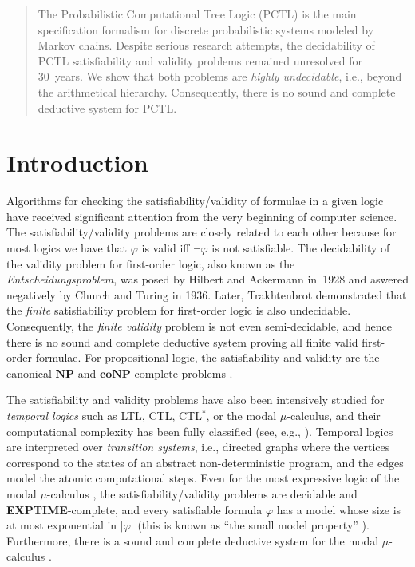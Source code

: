 \documentclass[a4paper,UKenglish,cleveref, autoref, thm-restate]{lipics-v2021}
\author{Miroslav Chodil}{Faculty of Informatics, Masaryk University, Brno, Czechia}{miroslav@chodil.com}{0000-0002-8406-0443}{}\author{Anton\'{\i}n Ku\v{c}era}{Faculty of Informatics, Masaryk University, Brno, Czechia}{tony@fi.muni.cz}{0000-0002-6602-8028}{}
\newcommand{\EXPTIME}{\textbf{EXPTIME}}
\newcommand{\NP}{\textbf{NP}}
\newcommand{\coNP}{\mathbf{coNP}}
\begin{document}
\maketitle



\begin{abstract}
    The Probabilistic Computational Tree Logic (PCTL) is the main specification formalism for discrete probabilistic systems modeled by Markov chains. 
    Despite serious research attempts, the decidability of PCTL satisfiability and validity problems remained unresolved for 30~years. We show that both problems are \emph{highly undecidable}, i.e., beyond the arithmetical hierarchy. Consequently, there is no sound and complete deductive system for PCTL. 
\end{abstract}

\section{Introduction}
\label{sec-intro}

Algorithms for checking the satisfiability/validity of formulae in a given logic have received significant attention from the very beginning of computer science. The satisfiability/validity problems are closely related to each other because for most logics we have that $\varphi$ is valid iff $\neg\varphi$ is not satisfiable. The decidability of the validity problem for first-order logic, also known as the \emph{Entscheidungsproblem}, was posed by Hilbert and Ackermann in~1928 and aswered negatively by Church \cite{Church:Entscheidungsproblem} and Turing \cite{Turing:Entscheidungsproblem} in 1936. Later, Trakhtenbrot \cite{Trakhtenbrot-FOL-finitesat} demonstrated that the \emph{finite} satisfiability problem for first-order logic is also undecidable. Consequently, the \emph{finite validity} problem is not even semi-decidable, and hence there is no sound and complete deductive system proving all finite valid first-order formulae. For propositional logic, the satisfiability and validity are the canonical $\NP$ and $\coNP$ complete problems \cite{Cook:SAT-NP-complete}.

The satisfiability and validity problems have also been intensively studied for \emph{temporal logics} such as LTL, CTL, CTL$^*$, or the modal $\mu$-calculus, and their computational complexity has been fully classified (see, e.g., \cite{Emerson:temp-logic-handbook,Stirling:temp-logic-handbook}). Temporal logics are interpreted over \emph{transition systems}, i.e., directed graphs where the vertices correspond to the states of an abstract non-deterministic program, and the edges model the atomic computational steps. Even for the most expressive logic of the modal $\mu$-calculus \cite{Kozen:mu-calculus}, the satisfiability/validity problems are decidable and \EXPTIME-complete, and every satisfiable formula $\varphi$ has a model whose size is at most exponential in $|\varphi|$ (this is known as ``the small model property'' \cite{Kozen:mu-calculus-finite-model}). Furthermore, there is a sound and complete deductive system for the modal $\mu$-calculus \cite{Walukiewicz:mucalculus-complete-LICS}.
\end{document}
